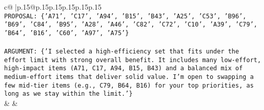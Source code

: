 \documentclass{article}
\begin{document}
{\begin{supertabular}{c@{$\;$}|p{.15\linewidth}@{}p{.15\linewidth}p{.15\linewidth}p{.15\linewidth}p{.15\linewidth}p{.15\linewidth}}
{{{\\ 
\texttt{PROPOSAL: \{'A71', 'C17', 'A94', 'B15', 'B43', 'A25', 'C53', 'B96', 'B69', 'C84', 'B95', 'A28', 'A46', 'C82', 'C72', 'C10', 'A39', 'C79', 'B64', 'B16', 'C60', 'A97', 'A75'\}} \\
\\ 
\texttt{ARGUMENT: \{'I selected a high{-}efficiency set that fits under the effort limit with strong overall benefit. It includes many low{-}effort, high{-}impact items (A71, C17, A94, B15, B43) and a balanced mix of medium{-}effort items that deliver solid value. I’m open to swapping a few mid{-}tier items (e.g., C79, B64, B16) for your top priorities, as long as we stay within the limit.'\}} \\
            }
        }
    }
    & & \\ \\


\end{supertabular}}
\end{document}
